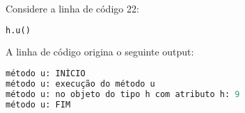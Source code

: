 \documentclass[12pt,varwidth=16cm,border=17pt]{standalone}
\begin{document}
Considere a linha de código 22:

\begin{lstlisting}[language=Python]
h.u()
\end{lstlisting}

A linha de código origina o seguinte output:

\begin{lstlisting}[language=Python]
método u: INÍCIO
método u: execução do método u
método u: no objeto do tipo h com atributo h: 9
método u: FIM
\end{lstlisting}
\end{document}
